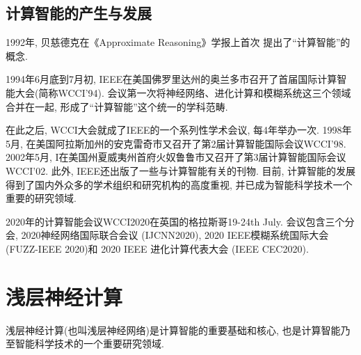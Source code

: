 \subsection{计算智能的产生与发展}
1992年, 贝慈德克在《Approximate Reasoning》学报上首次 提出了“计算智能”的概念.

%
%
1994年6月底到7月初, IEEE在美国佛罗里达州的奥兰多市召开了首届国际计算智能大会(简称WCCI'94). 会议第一次将神经网络、进化计算和模糊系统这三个领域合并在一起, 形成了“计算智能”这个统一的学科范畴.

在此之后, WCCI大会就成了IEEE的一个系列性学术会议, 每4年举办一次. 1998年5月, 在美国阿拉斯加州的安克雷奇市又召开了第2届计算智能国际会议WCCI’98.
2002年5月, I在美国州夏威夷州首府火奴鲁鲁市又召开了第3届计算智能国际会议WCCI'02.
此外, IEEE还出版了一些与计算智能有关的刊物.
目前, 计算智能的发展得到了国内外众多的学术组织和研究机构的高度重视, 并已成为智能科学技术一个重要的研究领域.

2020年的计算智能会议WCCI2020在英国的格拉斯哥19-24th July. 会议包含三个分会, 2020神经网络国际联合会议 (IJCNN2020), 2020 IEEE模糊系统国际大会 (FUZZ-IEEE 2020)和 2020 IEEE 进化计算代表大会 (IEEE CEC2020).
\section{浅层神经计算}
浅层神经计算(也叫浅层神经网络)是计算智能的重要基础和核心, 也是计算智能乃至智能科学技术的一个重要研究领域.

